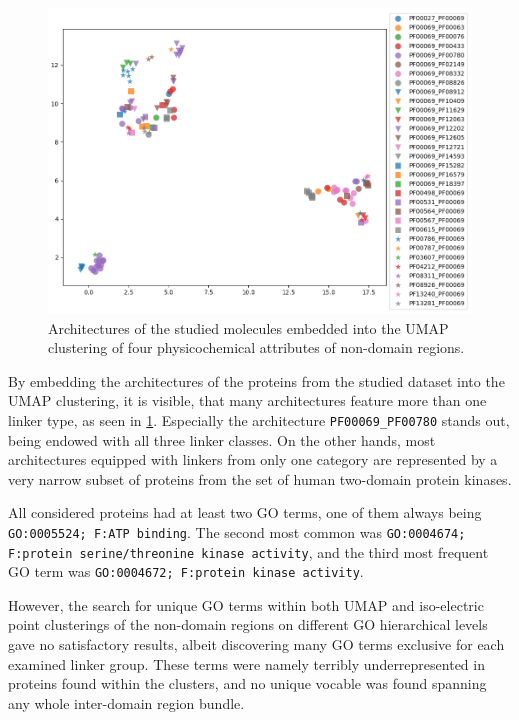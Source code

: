 		\begin{figure}
			\centering
			\includegraphics[width=0.9\linewidth]{img/linker_umap_arch.png}
			\caption{Architectures of the studied molecules embedded into the UMAP clustering
			of four physicochemical attributes of non-domain regions.}
			\label{fig:umap_arch}
		\end{figure}

		By embedding the architectures of the proteins from the studied dataset into the UMAP
		clustering, it is visible, that many architectures feature more than one linker type,
		as seen in \cref{fig:umap_arch}.
		Especially the architecture \texttt{PF00069\_PF00780} stands out, being endowed with
		all three linker classes.
		On the other hands, most architectures equipped with linkers from only one category
		are represented by a very narrow subset of proteins from the set of human two-domain
		protein kinases.

	\label{res:first:go}

		All considered proteins had at least two GO terms, one of them always being
		\texttt{GO:0005524; F:ATP binding}.
		The second most common was \texttt{GO:0004674; F:protein serine/threonine kinase
		activity}, and the third most frequent GO term was \texttt{GO:0004672; F:protein
		kinase activity}.

		However, the search for unique GO terms within both UMAP and iso-electric point
		clusterings of the non-domain regions on different GO hierarchical levels gave no
		satisfactory results, albeit discovering many GO terms exclusive for each examined
		linker group.
		These terms were namely terribly underrepresented in proteins found within the
		clusters, and no unique vocable was found spanning any whole inter-domain region
		bundle.

